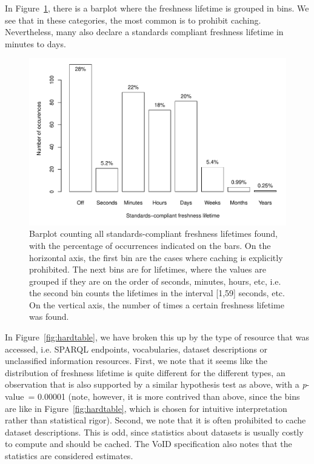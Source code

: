 \documentclass{llncs}
\newcommand{\pvalue}{\textit{p}-value\ }
\begin{document}
In Figure~\ref{fig:hardall}, there is a barplot where
the freshness lifetime is grouped in bins. We see that in these
categories, the most common is to prohibit caching. Nevertheless, many
also declare a standards compliant freshness lifetime in minutes to
days.

\begin{figure}[ht]
  \centerline{%
    \includegraphics[width=.9\textwidth]{hardall.pdf}}
  \caption{Barplot counting all standards-compliant freshness
    lifetimes found, with the percentage of occurrences indicated on
    the bars. On the horizontal axis, the first bin are the cases
    where caching is explicitly prohibited. The next bins are for
    lifetimes, where the values are grouped if they are on the order
    of seconds, minutes, hours, etc, i.e. the second bin counts the
    lifetimes in the interval [1,59] seconds, etc. On the vertical
    axis, the number of times a certain freshness lifetime was found.}
  \label{fig:hardall}
\end{figure}



In Figure~\ref{fig:hardtable}, we have broken this
up by the type of resource that was accessed, i.e. SPARQL endpoints,
vocabularies, dataset descriptions or unclassified information
resources. First, we note that it seems like the distribution of
freshness lifetime is quite different for the different types, an
observation that is also supported by a similar hypothesis test as
above, with a \pvalue = 0.00001 (note, however, it is more contrived
than above, since the bins are like in Figure~\ref{fig:hardtable},
which is chosen for intuitive interpretation rather than statistical
rigor). Second, we note that it is often prohibited to cache dataset
descriptions. This is odd, since statistics about datasets is usually
costly to compute and should be cached. The VoID specification
\cite{voidnote} also notes that the statistics are considered
estimates.
\end{document}

